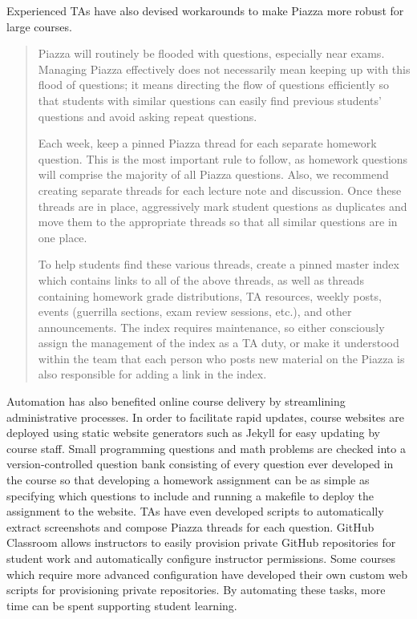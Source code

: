 Experienced TAs have also devised workarounds to make Piazza more robust for large courses.
\begin{quotation}
    Piazza will routinely be flooded with questions, especially near exams. Managing Piazza effectively does not necessarily mean keeping up with this flood of questions; it means directing the flow of questions efficiently so that students with similar questions can easily find previous students' questions and avoid asking repeat questions.

    Each week, keep a pinned Piazza thread for each separate homework question. This is the most important rule to follow, as homework questions will comprise the majority of all Piazza questions. Also, we recommend creating separate threads for each lecture note and discussion. Once these threads are in place, aggressively mark student questions as duplicates and move them to the appropriate threads so that all similar questions are in one place.

    To help students find these various threads, create a pinned master index which contains links to all of the above threads, as well as threads containing homework grade distributions, TA resources, weekly posts, events (guerrilla sections, exam review sessions, etc.), and other announcements. The index requires maintenance, so either consciously assign the management of the index as a TA duty, or make it understood within the team that each person who posts new material on the Piazza is also responsible for adding a link in the index.
\end{quotation}

Automation has also benefited online course delivery by streamlining administrative processes. In order to facilitate rapid updates, course websites are deployed using static website generators such as Jekyll for easy updating by course staff. Small programming questions and math problems are checked into a version-controlled question bank consisting of every question ever developed in the course so that developing a homework assignment can be as simple as specifying which questions to include and running a makefile to deploy the assignment to the website. TAs have even developed scripts to automatically extract screenshots and compose Piazza threads for each question. GitHub Classroom allows instructors to easily provision private GitHub repositories for student work and automatically configure instructor permissions. Some courses which require more advanced configuration have developed their own custom web scripts for provisioning private repositories. By automating these tasks, more time can be spent supporting student learning.

